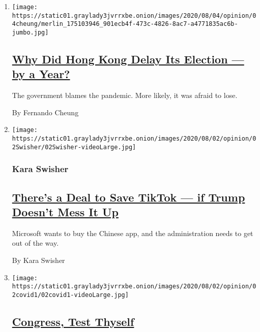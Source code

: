 \begin{enumerate}
\def\labelenumi{\arabic{enumi}.}
\item
  \texttt{[image: https://static01.graylady3jvrrxbe.onion/images/2020/08/04/opinion/04cheung/merlin\_175103946\_901ecb4f-473c-4826-8ac7-a4771835ac6b-jumbo.jpg]}

  \hypertarget{why-did-hong-kong-delay-its-election--by-a-year}{%
  \subsection{\texorpdfstring{\href{/2020/08/02/opinion/hong-kong-election-china.html}{Why
  Did Hong Kong Delay Its Election --- by a
  Year?}}{Why Did Hong Kong Delay Its Election --- by a Year?}}\label{why-did-hong-kong-delay-its-election--by-a-year}}

  The government blames the pandemic. More likely, it was afraid to
  lose.

  By Fernando Cheung
\item
  \texttt{[image: https://static01.graylady3jvrrxbe.onion/images/2020/08/02/opinion/02Swisher/02Swisher-videoLarge.jpg]}

  \hypertarget{kara-swisher}{%
  \subsubsection{Kara Swisher}\label{kara-swisher}}

  \hypertarget{theres-a-deal-to-save-tiktok--if-trump-doesnt-mess-it-up}{%
  \subsection{\texorpdfstring{\href{/2020/08/02/opinion/02tik-tok-china-trump.html}{There's
  a Deal to Save TikTok --- if Trump Doesn't Mess It
  Up}}{There's a Deal to Save TikTok --- if Trump Doesn't Mess It Up}}\label{theres-a-deal-to-save-tiktok--if-trump-doesnt-mess-it-up}}

  Microsoft wants to buy the Chinese app, and the administration needs
  to get out of the way.

  By Kara Swisher
\item
  \texttt{[image: https://static01.graylady3jvrrxbe.onion/images/2020/08/02/opinion/02covid1/02covid1-videoLarge.jpg]}

  \hypertarget{congress-test-thyself}{%
  \subsection{\texorpdfstring{\href{/2020/08/02/opinion/coronavirus-gohmert-congress-testing.html}{Congress,
  Test Thyself}}{Congress, Test Thyself}}\label{congress-test-thyself}}


\end{enumerate}
